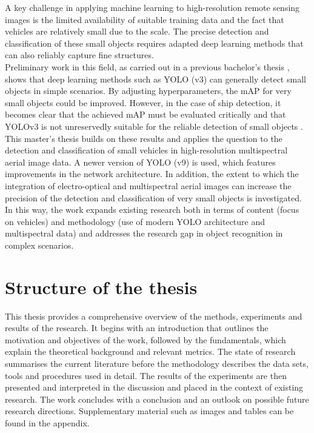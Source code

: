A key challenge in applying machine learning to high-resolution remote sensing images is the limited availability of suitable training data and the fact that vehicles are relatively small due to the scale. The precise detection and classification of these small objects requires adapted deep learning methods that can also reliably capture fine structures. \\
Preliminary work in this field, as carried out in a previous bachelor's thesis \cite{Balzer2022}, shows that deep learning methods such as \acrfull{YOLO} (v3) can generally detect small objects in simple scenarios. By adjusting hyperparameters, the \acrfull{mAP} for very small objects could be improved. However, in the case of ship detection, it becomes clear that the achieved mAP must be evaluated critically and that YOLOv3 is not unreservedly suitable for the reliable detection of small objects \cite{Balzer2022}. \\

This master's thesis builds on these results and applies the question to the detection and classification of small vehicles in high-resolution multispectral aerial image data. A newer version of \acrfull{YOLO} (v9) is used, which features improvements in the network architecture. In addition, the extent to which the integration of electro-optical and multispectral aerial images can increase the precision of the detection and classification of very small objects is investigated. In this way, the work expands existing research both in terms of content (focus on vehicles) and methodology (use of modern YOLO architecture and multispectral data) and addresses the research gap in object recognition in complex scenarios.



\section{Structure of the thesis}


This thesis provides a comprehensive overview of the methods, experiments and results of the research. It begins with an introduction that outlines the motivation and objectives of the work, followed by the fundamentals, which explain the theoretical background and relevant metrics. The state of research summarises the current literature before the methodology describes the data sets, tools and procedures used in detail. The results of the experiments are then presented and interpreted in the discussion and placed in the context of existing research. The work concludes with a conclusion and an outlook on possible future research directions. Supplementary material such as images and tables can be found in the appendix.
